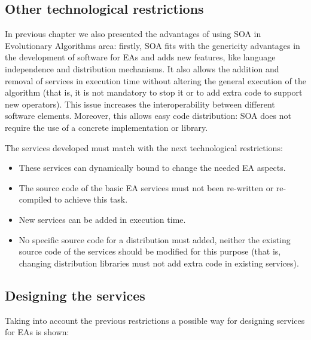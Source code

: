 \subsection{Other technological restrictions}

In previous chapter we also presented the advantages of using SOA in Evolutionary Algorithms area: firstly, SOA fits with the genericity advantages in the development of software for EAs \cite{GENERICITY05} and adds new features, like language independence and  distribution mechanisms. It also allows the addition and removal of services in execution time without altering the general execution of the algorithm (that is, it is not mandatory to stop it or to add extra code to support new operators). This issue increases the interoperability between different software elements. Moreover, this allows easy code distribution: SOA does not require the use of a concrete implementation or library.

The services developed must match with the next technological restrictions:
\begin{itemize}
\item These services can dynamically bound to change the needed EA aspects. 
\item The source code of  the basic EA services must not been re-written or re-compiled to achieve this task. 
\item New services can be added in execution time. 
\item No specific source code for a distribution must added, neither the existing source code of the services should be modified for this purpose (that is, changing distribution libraries must not add extra code in existing services).
\end{itemize}

\subsection{Designing the services}

Taking into account the previous restrictions a possible way for designing services for EAs is shown: 

